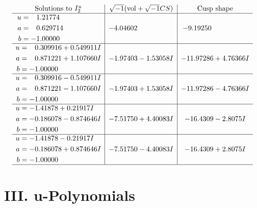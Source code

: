\documentclass[1p]{elsarticle_modified}
\theoremstyle{definition}
\newcommand{\I}{\sqrt{-1}}
\begin{document}
$$\begin{array}{c|c|c}  
\text{Solutions to }I^u_{2}& \I (\text{vol} + \sqrt{-1}CS) & \text{Cusp shape}\\
 \hline 
\begin{aligned}
u &= \phantom{-}1.21774\phantom{ +0.000000I} \\
a &= \phantom{-}0.629714\phantom{ +0.000000I} \\
b &= -1.00000\phantom{ +0.000000I}\end{aligned}
 & -4.04602\phantom{ +0.000000I} & -9.19250\phantom{ +0.000000I} \\ \hline\begin{aligned}
u &= \phantom{-}0.309916 + 0.549911 I \\
a &= \phantom{-}0.871221 + 1.107660 I \\
b &= -1.00000\phantom{ +0.000000I}\end{aligned}
 & -1.97403 - 1.53058 I & -11.97286 + 4.76366 I \\ \hline\begin{aligned}
u &= \phantom{-}0.309916 - 0.549911 I \\
a &= \phantom{-}0.871221 - 1.107660 I \\
b &= -1.00000\phantom{ +0.000000I}\end{aligned}
 & -1.97403 + 1.53058 I & -11.97286 - 4.76366 I \\ \hline\begin{aligned}
u &= -1.41878 + 0.21917 I \\
a &= -0.186078 - 0.874646 I \\
b &= -1.00000\phantom{ +0.000000I}\end{aligned}
 & -7.51750 + 4.40083 I & -16.4309 - 2.8075 I \\ \hline\begin{aligned}
u &= -1.41878 - 0.21917 I \\
a &= -0.186078 + 0.874646 I \\
b &= -1.00000\phantom{ +0.000000I}\end{aligned}
 & -7.51750 - 4.40083 I & -16.4309 + 2.8075 I\\
 \hline 
 \end{array}$$\newpage
\newpage\renewcommand{\arraystretch}{1}
\centering \section*{ III. u-Polynomials}
\end{document}
